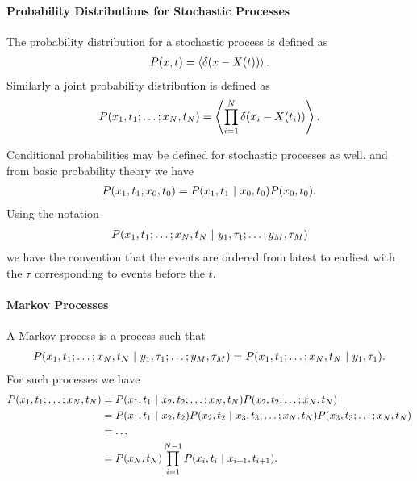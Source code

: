 \paragraph{Probability Distributions for Stochastic Processes}
The probability distribution for a stochastic process is defined as
\begin{align*}
	P(x, t) = \expval{\delta(x - X(t))}.
\end{align*}
Similarly a joint probability distribution is defined as
\begin{align*}
	P(x_{1}, t_{1}; \dots; x_{N}, t_{N}) = \expval{\prod\limits_{i = 1}^{N}\delta(x_{i} - X(t_{i}))}.
\end{align*}

Conditional probabilities may be defined for stochastic processes as well, and from basic probability theory we have
\begin{align*}
	P(x_{1}, t_{1}; x_{0}, t_{0}) = P(x_{1}, t_{1} \ | \  x_{0}, t_{0})P(x_{0}, t_{0}).
\end{align*}
Using the notation
\begin{align*}
	P(x_{1}, t_{1}; \dots; x_{N}, t_{N} \ | \  y_{1}, \tau_{1}; \dots; y_{M}, \tau_{M})
\end{align*}
we have the convention that the events are ordered from latest to earliest with the $\tau$ corresponding to events before the $t$.

\paragraph{Markov Processes}
A Markov process is a process such that
\begin{align*}
	P(x_{1}, t_{1}; \dots; x_{N}, t_{N} \ | \  y_{1}, \tau_{1}; \dots; y_{M}, \tau_{M}) = P(x_{1}, t_{1}; \dots; x_{N}, t_{N} \ | \  y_{1}, \tau_{1}).
\end{align*}
For such processes we have
\begin{align*}
	P(x_{1}, t_{1}; \dots; x_{N}, t_{N}) &= P(x_{1}, t_{1} \ | \  x_{2}, t_{2}; \dots; x_{N}, t_{N})P(x_{2}, t_{2}; \dots; x_{N}, t_{N}) \\
	                                     &= P(x_{1}, t_{1} \ | \  x_{2}, t_{2})P(x_{2}, t_{2} \ | \  x_{3}, t_{3}; \dots; x_{N}, t_{N})P(x_{3}, t_{3}; \dots; x_{N}, t_{N}) \\
	                                     &= \dots \\
	                                     &= P(x_{N}, t_{N})\prod\limits_{i = 1}^{N - 1}P(x_{i}, t_{i} \ | \  x_{i + 1}, t_{i + 1}).
\end{align*}

